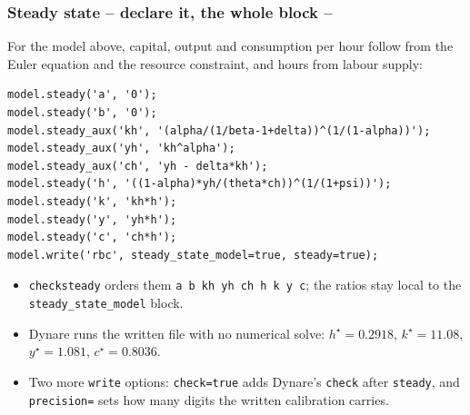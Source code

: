 \documentclass[10pt,slidestop]{beamer}
\theoremstyle{plain}
\begin{document}
\begin{frame}[fragile]
  \frametitle{Steady state -- declare it, the whole block --}

  For the model above, capital, output and consumption per hour follow from the
  Euler equation and the resource constraint, and hours from labour supply:

  \begin{lstlisting}[style=MatlabConsole,basicstyle=\ttfamily\scriptsize]
model.steady('a', '0');
model.steady('b', '0');
model.steady_aux('kh', '(alpha/(1/beta-1+delta))^(1/(1-alpha))');
model.steady_aux('yh', 'kh^alpha');
model.steady_aux('ch', 'yh - delta*kh');
model.steady('h', '((1-alpha)*yh/(theta*ch))^(1/(1+psi))');
model.steady('k', 'kh*h');
model.steady('y', 'yh*h');
model.steady('c', 'ch*h');
model.write('rbc', steady_state_model=true, steady=true);
  \end{lstlisting}

  \begin{itemize}\small
  \item \verb+checksteady+ orders them \verb+a b kh yh ch h k y c+; the ratios stay
    local to the \verb+steady_state_model+ block.
  \item Dynare runs the written file with no numerical solve:
    $h^\star = 0.2918$, $k^\star = 11.08$, $y^\star = 1.081$, $c^\star = 0.8036$.
  \item Two more \verb+write+ options: \verb+check=true+ adds Dynare's \verb+check+ after
    \verb+steady+, and \verb+precision=+ sets how many digits the written calibration carries.
  \end{itemize}

\end{frame}


\end{document}
